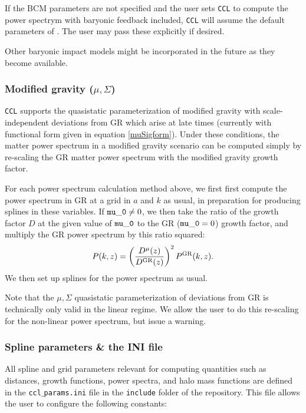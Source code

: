 \documentclass[\docopts]{\docclass}
\newcommand{\ccl}{{\tt CCL}\xspace}
\begin{document}
If the BCM parameters are not specified and the user sets \ccl to compute the power spectrym with baryonic feedback included, \ccl will assume the default parameters of \citet{Schneider15}. The user may pass these explicitly if desired. 

Other baryonic impact models might be incorporated in the future as they become available.

\subsubsection{Modified gravity ($\mu, \Sigma$)}
\ccl supports the quasistatic parameterization of modified gravity with scale-independent deviations from GR which arise at late times (currently with functional form given in equation \ref{muSigform}). Under these conditions, the matter power spectrum in a modified gravity scenario can be computed simply by re-scaling the GR matter power spectrum with the modified gravity growth factor.

For each power spectrum calculation method above, we first first compute the power spectrum in GR at a grid in $a$ and $k$ as usual, in preparation for producing splines in these variables. If ${\tt mu\_0} \ne 0$, we then take the ratio of the growth factor $D$ at the given value of ${\tt mu\_0}$ to the GR (${\tt mu\_0}=0$) growth factor, and multiply the GR power spectrum by this ratio squared:
\begin{equation}
P(k,z) = \left(\frac{D^{\mu}(z)}{D^{\rm GR}(z)}\right)^2 P^{\rm GR}(k,z).
\label{Pkmu}
\end{equation}
We then set up splines for the power spectrum as usual. 

Note that the $\mu, \Sigma$ quasistatic parameterization of deviations from GR is technically only valid in the linear regime. We allow the user to do this re-scaling for the non-linear power spectrum, but issue a warning.

\subsubsection{Spline parameters \& the INI file}

All spline and grid parameters relevant for computing quantities such as distances, growth functions, power spectra, and halo mass functions are defined in the {\tt ccl$\_$params.ini} file in the {\tt include} folder of the repository. This file allows the user to configure the following constants:
\end{document}
